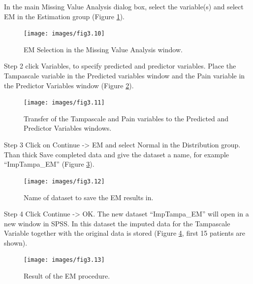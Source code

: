 \documentclass[
]{book}
\begin{document}
In the main Missing Value Analysis dialog box, select the variable(s) and select EM in the Estimation group (Figure \ref{fig:fig3-10}).

\begin{figure}

{\centering \texttt{[image: images/fig3.10]} 

}

\caption{EM Selection in the Missing Value Analysis window.}\label{fig:fig3-10}
\end{figure}

Step 2
click Variables, to specify predicted and predictor variables. Place the Tampascale variable in the Predicted variables window and the Pain variable in the Predictor Variables window (Figure \ref{fig:fig3-11}).

\begin{figure}

{\centering \texttt{[image: images/fig3.11]} 

}

\caption{Transfer of the Tampascale and Pain variables to the Predicted and Predictor Variables windows.}\label{fig:fig3-11}
\end{figure}

Step 3
Click on Continue -\textgreater{} EM and select Normal in the Distribution group. Than thick Save completed data and give the dataset a name, for example ``ImpTampa\_EM'' (Figure \ref{fig:fig3-12}).

\begin{figure}

{\centering \texttt{[image: images/fig3.12]} 

}

\caption{Name of dataset to save the EM results in.}\label{fig:fig3-12}
\end{figure}

Step 4
Click Continue -\textgreater{} OK. The new dataset ``ImpTampa\_EM'' will open in a new window in SPSS. In this dataset the imputed data for the Tampascale Variable together with the original data is stored (Figure \ref{fig:fig3-13}, first 15 patients are shown).

\begin{figure}

{\centering \texttt{[image: images/fig3.13]} 

}

\caption{Result of the EM procedure.}\label{fig:fig3-13}
\end{figure}
\end{document}

